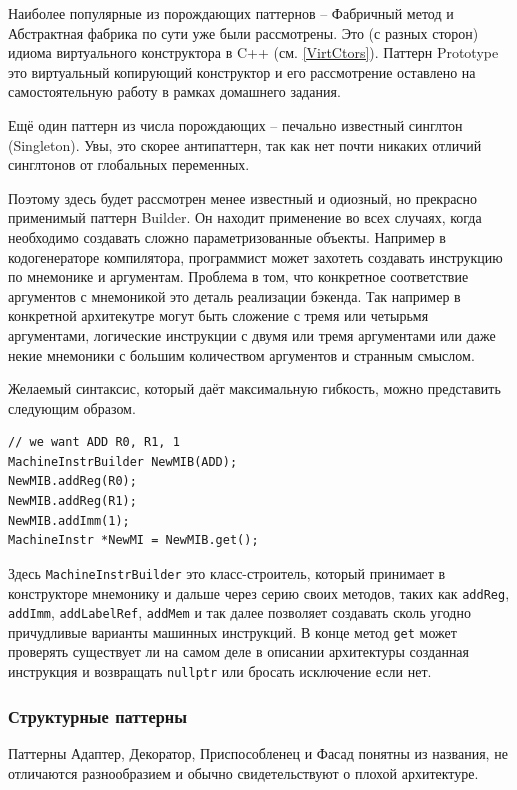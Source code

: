\documentclass[a4paper,12pt,oneside]{article}
\begin{document}
Наиболее популярные из порождающих паттернов -- Фабричный метод и Абстрактная фабрика по сути уже были рассмотрены. Это (с разных сторон) идиома виртуального конструктора в C++ (см. \ref{VirtCtors}). Паттерн Prototype это виртуальный копирующий конструктор и его рассмотрение оставлено на самостоятельную работу в рамках домашнего задания.

Ещё один паттерн из числа порождающих -- печально известный синглтон (Singleton). Увы, это скорее антипаттерн, так как нет почти никаких отличий синглтонов от глобальных переменных.

Поэтому здесь будет рассмотрен менее известный и одиозный, но прекрасно применимый паттерн Builder. Он находит применение во всех случаях, когда необходимо создавать сложно параметризованные объекты. Например в кодогенераторе компилятора, программист может захотеть создавать инструкцию по мнемонике и аргументам. Проблема в том, что конкретное соответствие аргументов с мнемоникой это деталь реализации бэкенда. Так например в конкретной архитекутре могут быть сложение с тремя или четырьмя аргументами, логические инструкции с двумя или тремя аргументами или даже некие мнемоники с большим количеством аргументов и странным смыслом.

Желаемый синтаксис, который даёт максимальную гибкость, можно представить следующим образом.

\begin{lstlisting}
// we want ADD R0, R1, 1
MachineInstrBuilder NewMIB(ADD);
NewMIB.addReg(R0);
NewMIB.addReg(R1);
NewMIB.addImm(1);
MachineInstr *NewMI = NewMIB.get();
\end{lstlisting}

Здесь \lstinline!MachineInstrBuilder! это класс-строитель, который принимает в конструкторе мнемонику и дальше через серию своих методов, таких как \lstinline!addReg!, \lstinline!addImm!, \lstinline!addLabelRef!, \lstinline!addMem! и так далее позволяет создавать сколь угодно причудливые варианты машинных инструкций. В конце метод \lstinline!get! может проверять существует ли на самом деле в описании архитектуры созданная инструкция и возвращать \lstinline!nullptr! или бросать исключение если нет.

\subsubsection{Структурные паттерны}

Паттерны Адаптер, Декоратор, Приспособленец и Фасад понятны из названия, не отличаются разнообразием и обычно свидетельствуют о плохой архитектуре.
\end{document}
